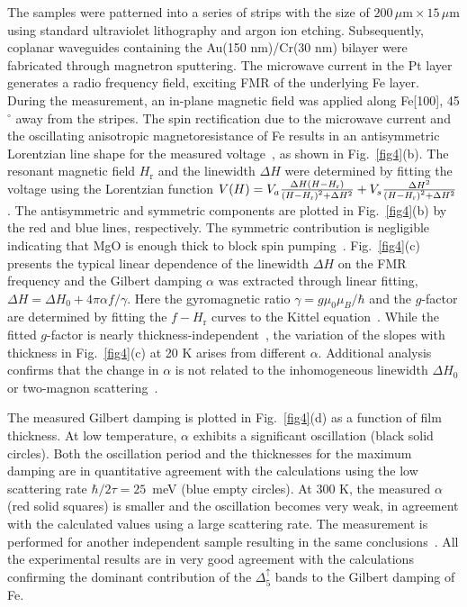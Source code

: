 \documentclass[prl,aps,twocolumn,showpacs,citeautoscript,reprint,superscriptaddress]{revtex4-1}
\begin{document}
The samples were patterned into a series of strips with the size of $200\,\mu\mathrm m\times15\,\mu\mathrm m$ using standard ultraviolet lithography and argon ion etching. Subsequently, coplanar waveguides containing the Au(150 nm)/Cr(30 nm) bilayer were fabricated through magnetron sputtering. The microwave current in the Pt layer generates a radio frequency field, exciting FMR of the underlying Fe layer. During the measurement, an in-plane magnetic field was applied along Fe[100], 45$^\circ$ away from the stripes. The spin rectification due to the microwave current and the oscillating anisotropic magnetoresistance of Fe results in an antisymmetric Lorentzian line shape for the measured voltage~\cite{Hu:PRL07,Hu:PhysRep16}, as shown in Fig.~\ref{fig4}(b). The resonant magnetic field $H_\mathrm{r}$ and the linewidth $\Delta H$ were determined by fitting the voltage using the Lorentzian function $V(H)=V_a\frac{\Delta H\left(H-H_{\rm r}\right)}{\left(H-H_{\rm r}\right)^2+\Delta H^2}+V_s\frac{\Delta H^2}{\left(H-H_{\rm r}\right)^2+\Delta H^2}$. The antisymmetric and symmetric components are plotted in Fig.~\ref{fig4}(b) by the red and blue lines, respectively. The symmetric contribution is negligible indicating that MgO is enough thick to block spin pumping~\cite{Pap:APL17}. Fig.~\ref{fig4}(c) presents the typical linear dependence of the linewidth $\Delta H$ on the FMR frequency and the Gilbert damping $\alpha$ was extracted through linear fitting, $\Delta H=\Delta H_0+4\pi \alpha f/\gamma$. Here the gyromagnetic ratio $\gamma=g\mu_0\mu_B/\hbar$ and the $g$-factor are determined by fitting the $f-H_\mathrm{r}$ curves to the Kittel equation~\cite{Kittel:PhysRev48}. While the fitted $g$-factor is nearly thickness-independent~\cite{SM}, the variation of the slopes with thickness in Fig.~\ref{fig4}(c) at 20 K arises from different $\alpha$. Additional analysis confirms that the change in $\alpha$ is not related to the inhomogeneous linewidth $\Delta H_0$ or two-magnon scattering~\cite{SM,TMS1,TMS2}.

The measured Gilbert damping is plotted in Fig.~\ref{fig4}(d) as a function of film thickness. At low temperature, $\alpha$ exhibits a significant oscillation (black solid circles). Both the oscillation period and the thicknesses for the maximum damping are in quantitative agreement with the calculations using the low scattering rate $\hbar/2\tau=25$~meV (blue empty circles). At 300 K, the measured $\alpha$ (red solid squares) is smaller and the oscillation becomes very weak, in agreement with the calculated values using a large scattering rate. The measurement is performed for another independent sample resulting in the same conclusions~\cite{SM}. All the experimental results are in very good agreement with the calculations confirming the dominant contribution of the $\Delta_5^\uparrow$ bands to the Gilbert damping of Fe. %
	
\end{document}
